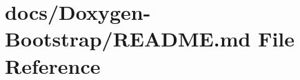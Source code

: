 \hypertarget{docs_2_doxygen-_bootstrap_2_r_e_a_d_m_e_8md}{}\section{docs/\+Doxygen-\/\+Bootstrap/\+R\+E\+A\+D\+ME.md File Reference}
\label{docs_2_doxygen-_bootstrap_2_r_e_a_d_m_e_8md}
